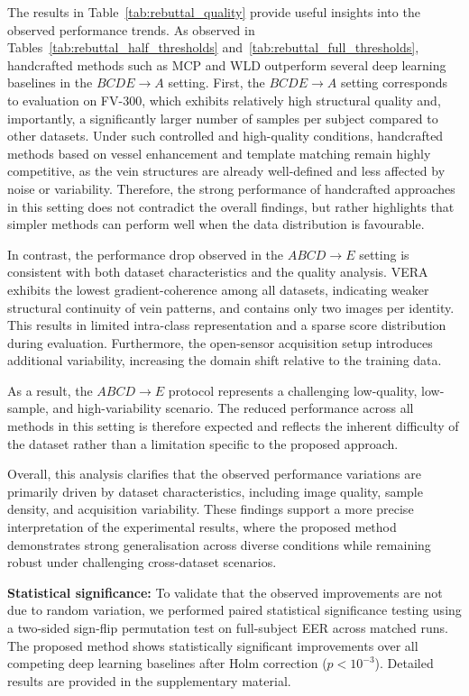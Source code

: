 \documentclass[10pt,journal,compsoc]{IEEEtran}
\begin{document}
The results in Table~\ref{tab:rebuttal_quality} provide useful insights into the observed performance trends. As observed in Tables~\ref{tab:rebuttal_half_thresholds} and~\ref{tab:rebuttal_full_thresholds}, handcrafted methods such as MCP and WLD outperform several deep learning baselines in the \(BCDE \rightarrow A\) setting.
First, the $BCDE \rightarrow A$ setting corresponds to evaluation on FV-300, which exhibits relatively high structural quality and, importantly, a significantly larger number of samples per subject compared to other datasets. Under such controlled and high-quality conditions, handcrafted methods based on vessel enhancement and template matching remain highly competitive, as the vein structures are already well-defined and less affected by noise or variability. Therefore, the strong performance of handcrafted approaches in this setting does not contradict the overall findings, but rather highlights that simpler methods can perform well when the data distribution is favourable.

In contrast, the performance drop observed in the $ABCD \rightarrow E$ setting is consistent with both dataset characteristics and the quality analysis. VERA exhibits the lowest gradient-coherence among all datasets, indicating weaker structural continuity of vein patterns, and contains only two images per identity. This results in limited intra-class representation and a sparse score distribution during evaluation. Furthermore, the open-sensor acquisition setup introduces additional variability, increasing the domain shift relative to the training data.

As a result, the $ABCD \rightarrow E$ protocol represents a challenging low-quality, low-sample, and high-variability scenario. The reduced performance across all methods in this setting is therefore expected and reflects the inherent difficulty of the dataset rather than a limitation specific to the proposed approach.

Overall, this analysis clarifies that the observed performance variations are primarily driven by dataset characteristics, including image quality, sample density, and acquisition variability. These findings support a more precise interpretation of the experimental results, where the proposed method demonstrates strong generalisation across diverse conditions while remaining robust under challenging cross-dataset scenarios.

\textbf{Statistical significance:}
To validate that the observed improvements are not due to random variation, we performed paired statistical significance testing using a two-sided sign-flip permutation test on full-subject EER across matched runs. The proposed method shows statistically significant improvements over all competing deep learning baselines after Holm correction ($p < 10^{-3}$). Detailed results are provided in the supplementary material.
\end{document}
